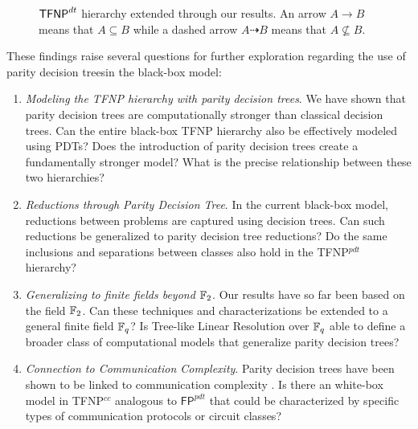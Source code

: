 \begin{figure}[H]

    
    \caption{$\mathsf{TFNP}^{dt}$ hierarchy extended through our results. An arrow $A \to B$ means that $A \subseteq B$ while a dashed arrow $A \dashrightarrow B$ means that $A \not\subseteq B$.}   
\end{figure} 

\noindent
These findings raise several questions for further exploration regarding the use of parity decision treesin the black-box model:
\begin{enumerate}
    \item \textit{Modeling the \textsf{TFNP} hierarchy with parity decision trees}. We have shown that parity decision trees are computationally stronger than classical decision trees. Can the entire black-box \textsf{TFNP} hierarchy also be effectively modeled using PDTs? Does the introduction of parity decision trees create a fundamentally stronger model? What is the precise relationship between these two hierarchies?
    \item \textit{Reductions through Parity Decision Tree}. In the current black-box model, reductions between problems are captured using decision trees. Can such reductions be generalized to parity decision tree reductions? Do the same inclusions and separations between classes also hold in the \textsf{TFNP}$^{pdt}$ hierarchy?
    \item \textit{Generalizing to finite fields beyond $\mathbb{F}_2$}. Our results have so far been based on the field $\mathbb{F}_2$. Can these techniques and characterizations be extended to a general finite field $\mathbb{F}_q$? Is Tree-like Linear Resolution over $\mathbb{F}_q$ able to define a broader class of computational models that generalize parity decision trees?
    \item \textit{Connection to Communication Complexity}. Parity decision trees have been shown to be linked to communication complexity  \cite{pdts_comm_compl}. Is there an white-box model in \textsf{TFNP}$^{cc}$ analogous to $\textsf{FP}^{pdt}$ that could be characterized by specific types of communication protocols or circuit classes?

\end{enumerate}

